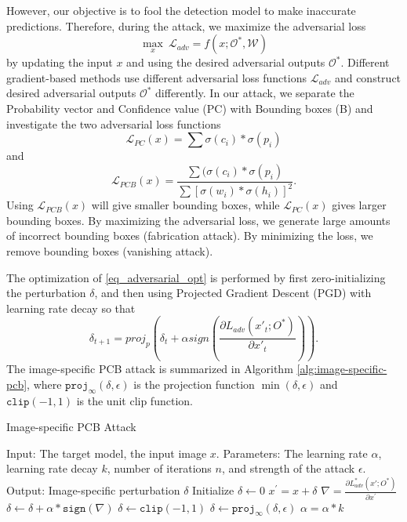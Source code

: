 However, our objective is to fool the detection model to make inaccurate predictions. Therefore, during the attack, we maximize the adversarial loss 
\begin{equation}
\label{eq_adversarial_opt}
\max_{x} \ \mathcal{L}_{adv} = f(x; \mathcal{O}^{\ast}, \mathcal{W})
\end{equation}
by updating the input $x$ and using the desired adversarial outputs $\mathcal{O}^{\ast}$. Different gradient-based methods use different adversarial loss functions $\mathcal{L}_{adv}$ and construct desired adversarial outputs $\mathcal{O}^{\ast}$ differently. In our attack, we separate the Probability vector and Confidence value (PC) with Bounding boxes (B) and investigate the two adversarial loss functions
\begin{equation}
\mathcal{L}_{PC}(x) = \sum{\sigma(c_i) * \sigma(p_i)}
\end{equation}
and
\begin{equation}
\mathcal{L}_{PCB}(x) = \frac{\sum{(\sigma(c_i) * \sigma(p_i)}}{\sum{[\sigma(w_i) * \sigma(h_i)]^2}}.
\end{equation}
Using $\mathcal{L}_{PCB}(x)$ will give smaller bounding boxes, while $\mathcal{L}_{PC}(x)$ gives larger bounding boxes. By maximizing the adversarial loss, we generate large amounts of incorrect bounding boxes (fabrication attack). By minimizing the loss, we remove bounding boxes (vanishing attack).

The optimization of \eqref{eq_adversarial_opt} is performed by first zero-initializing the perturbation $\delta$, and then using Projected Gradient Descent (PGD) \citep{madry2017towards} with learning rate decay so that 
\begin{equation}
\delta_{t+1} = proj_p(\delta_{t} + \alpha sign(\frac{\partial L_{adv}(x'_{t};O^*)}{\partial x'_{t}} )).
\end{equation}
The image-specific PCB attack is summarized in Algorithm \ref{alg:image-specific-pcb}, where 
$\texttt{proj}_{\infty}(\delta,\epsilon)$ is the projection function $\min(\delta,\epsilon)$ and $\texttt{clip}(-1, 1)$ is the unit clip function.

\begin{algorithm}
    \caption{Image-specific PCB Attack}\label{alg:image-specific-pcb}
    \begin{algorithmic}
        \STATE Input: The target model, the input image $x$.
        \STATE Parameters: The learning rate $\alpha$, learning rate decay $k$, number of iterations $n$, and strength of the attack $\epsilon$.
        \STATE Output: Image-specific perturbation $\delta$
        \STATE Initialize $\delta \leftarrow 0$
            \STATE $x^{'} = x + \delta$  
            \STATE $\nabla = \frac{\partial L_{adv}^*(x';O^*)}{\partial x^{'}}$
            \STATE $\delta \leftarrow \delta + \alpha * \texttt{sign}(\nabla)$
            \STATE $\delta \leftarrow \texttt{clip}(-1, 1)$
            \STATE $\delta \leftarrow  \texttt{proj}_{\infty}(\delta,\epsilon)$ 
            \STATE $\alpha = \alpha * k$ %
        \ENDFOR
    \end{algorithmic}
\end{algorithm}

